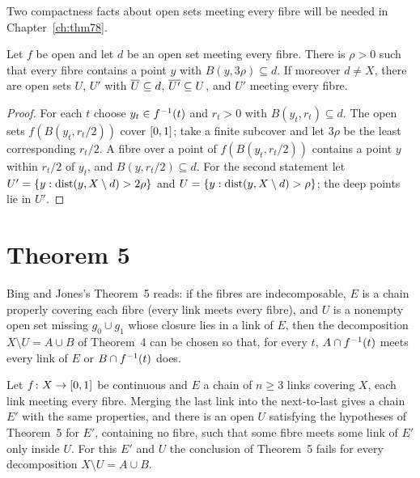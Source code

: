 
Two compactness facts about open sets meeting every fibre will be needed in Chapter~\ref{ch:thm78}.

\begin{lemma}\label{lem:deep}
Let $f$ be open and let $d$ be an open set meeting every fibre. There is $\rho>0$ such that every fibre contains a point $y$ with $B(y,3\rho)\subseteq d$.
If moreover $d\neq X$, there are open sets $U$, $U'$ with $\overline{U}\subseteq d$, $\overline{U'}\subseteq U$, and $U'$ meeting every fibre.
\end{lemma}

\begin{proof}
For each $t$ choose $y_t\in f^{-1}(t)$ and $r_t>0$ with $B(y_t,r_t)\subseteq d$. The open sets $f(B(y_t,r_t/2))$ cover $[0,1]$; take a finite subcover and let $3\rho$
be the least corresponding $r_t/2$. A fibre over a point of $f(B(y_t,r_t/2))$ contains a point $y$ within $r_t/2$ of $y_t$, and $B(y,r_t/2)\subseteq d$. For the
second statement let $U'=\left\{ y:\operatorname{dist}(y,X\setminus d)>2\rho \right\}$ and $U=\left\{ y:\operatorname{dist}(y,X\setminus d)>\rho \right\}$; the deep points lie in $U'$.
\end{proof}


\section{Theorem 5}

Bing and Jones's Theorem~5 reads: if the fibres are indecomposable, $E$ is a chain properly covering each fibre (every link meets every fibre), and $U$ is a
nonempty open set missing $g_0\cup g_1$ whose closure lies in a link of $E$, then the decomposition $X\setminus U=A\cup B$ of Theorem~4 can be chosen so that,
for every $t$, $A\cap f^{-1}(t)$ meets every link of $E$ or $B\cap f^{-1}(t)$ does.

\begin{proposition}\label{prop:bj5-false}
Let $f\colon X\to[0,1]$ be continuous and $E$ a chain of $n\ge3$ links covering $X$, each link meeting every fibre. Merging the last link into the
next-to-last gives a chain $E'$ with the same properties, and there is an open $U$ satisfying the hypotheses of Theorem~5 for $E'$, containing no fibre,
such that some fibre meets some link of $E'$ only inside $U$. For this $E'$ and $U$ the conclusion of Theorem~5 fails for every decomposition $X\setminus
U=A\cup B$.
\end{proposition}

